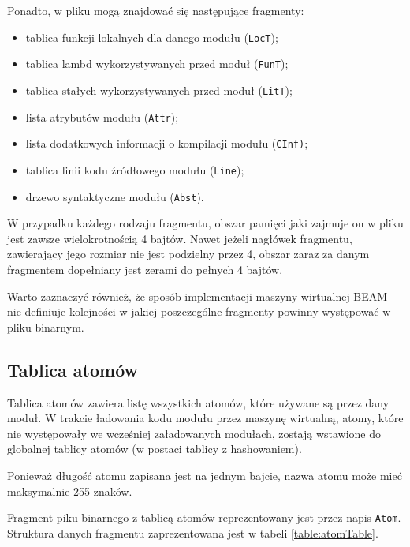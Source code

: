Ponadto, w pliku mogą znajdować się następujące fragmenty:
\begin{itemize}
\item tablica funkcji lokalnych dla danego modułu (\texttt{LocT});
\item tablica lambd wykorzystywanych przed moduł (\texttt{FunT});
\item tablica stałych wykorzystywanych przed moduł (\texttt{LitT});
\item lista atrybutów modułu (\texttt{Attr});
\item lista dodatkowych informacji o kompilacji modułu (\texttt{CInf)};
\item tablica linii kodu źródłowego modułu (\texttt{Line});
\item drzewo syntaktyczne modułu (\texttt{Abst}).
\end{itemize}

W przypadku każdego rodzaju fragmentu, obszar pamięci jaki zajmuje on w pliku jest zawsze wielokrotnością 4 bajtów. Nawet jeżeli nagłówek fragmentu, zawierający jego rozmiar nie jest podzielny przez 4, obszar zaraz za danym fragmentem dopełniany jest zerami do pełnych 4 bajtów.

Warto zaznaczyć również, że sposób implementacji maszyny wirtualnej BEAM nie definiuje kolejności w jakiej poszczególne fragmenty powinny występować w pliku binarnym.

\subsection{Tablica atomów}
Tablica atomów zawiera listę wszystkich atomów, które używane są przez dany moduł. W trakcie ładowania kodu modułu przez maszynę wirtualną, atomy, które nie występowały we wcześniej załadowanych modułach, zostają wstawione do globalnej tablicy atomów (w postaci tablicy z hashowaniem).

Ponieważ długość atomu zapisana jest na jednym bajcie, nazwa atomu może mieć maksymalnie 255 znaków.

Fragment piku binarnego z tablicą atomów reprezentowany jest przez napis \texttt{Atom}. Struktura danych fragmentu zaprezentowana jest w tabeli \ref{table:atomTable}.

